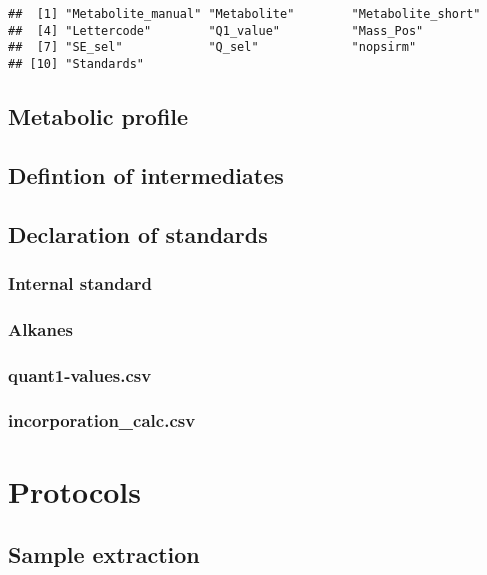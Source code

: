 \documentclass[]{book}
\theoremstyle{definition}
\theoremstyle{definition}
\theoremstyle{definition}
\theoremstyle{remark}
\begin{document}
\begin{verbatim}
##  [1] "Metabolite_manual" "Metabolite"        "Metabolite_short" 
##  [4] "Lettercode"        "Q1_value"          "Mass_Pos"         
##  [7] "SE_sel"            "Q_sel"             "nopsirm"          
## [10] "Standards"
\end{verbatim}

\section{Metabolic profile}\label{metabolic-profile}

\section{Defintion of intermediates}\label{defintion-of-intermediates}

\section{Declaration of standards}\label{declaration-of-standards}

\subsection{Internal standard}\label{internal-standard-1}

\subsection{Alkanes}\label{alkanes}

\subsection{quant1-values.csv}\label{quant1-values.csv}

\subsection{incorporation\_calc.csv}\label{incorporation_calc.csv}

\chapter{Protocols}\label{protocols}

\section{Sample extraction}\label{sample-extraction}
\end{document}
